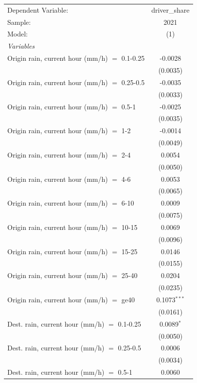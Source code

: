 \ifdefined\ifclassloaded
{}
\fi
\begingroup
\centering
\begin{tabular}{lc}
   \tabularnewline \midrule \midrule
   Dependent Variable: & driver\_share\\
   Sample: & 2021 \\
   Model: & (1)\\
   \midrule
   \emph{Variables}\\
   Origin rain, current hour (mm/h) $=$ 0.1-0.25 & -0.0028\\
    & (0.0035)\\
   Origin rain, current hour (mm/h) $=$ 0.25-0.5 & -0.0035\\
    & (0.0033)\\
   Origin rain, current hour (mm/h) $=$ 0.5-1 & -0.0025\\
    & (0.0035)\\
   Origin rain, current hour (mm/h) $=$ 1-2 & -0.0014\\
    & (0.0049)\\
   Origin rain, current hour (mm/h) $=$ 2-4 & 0.0054\\
    & (0.0050)\\
   Origin rain, current hour (mm/h) $=$ 4-6 & 0.0053\\
    & (0.0065)\\
   Origin rain, current hour (mm/h) $=$ 6-10 & 0.0009\\
    & (0.0075)\\
   Origin rain, current hour (mm/h) $=$ 10-15 & 0.0069\\
    & (0.0096)\\
   Origin rain, current hour (mm/h) $=$ 15-25 & 0.0146\\
    & (0.0155)\\
   Origin rain, current hour (mm/h) $=$ 25-40 & 0.0204\\
    & (0.0235)\\
   Origin rain, current hour (mm/h) $=$ ge40 & 0.1073$^{***}$\\
    & (0.0161)\\
   Dest. rain, current hour (mm/h) $=$ 0.1-0.25 & 0.0089$^{*}$\\
    & (0.0050)\\
   Dest. rain, current hour (mm/h) $=$ 0.25-0.5 & 0.0006\\
    & (0.0034)\\
   Dest. rain, current hour (mm/h) $=$ 0.5-1 & 0.0060\\

\end{tabular}
